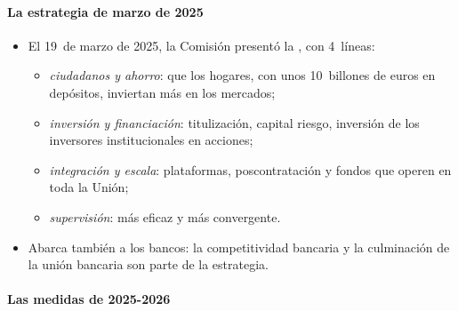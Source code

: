 \documentclass[11pt]{article}
\begin{document}
\paragraph{La estrategia de marzo de 2025}

\begin{itemize}
\item El 19~de marzo de 2025, la Comisión presentó la , con 4~líneas\nocite{CE2025UAI}:
  \begin{itemize}
  \item \emph{ciudadanos y ahorro}: que los hogares, con unos 10~billones de euros en depósitos, inviertan más en los mercados;
  \item \emph{inversión y financiación}: titulización, capital riesgo, inversión de los inversores institucionales en acciones;
  \item \emph{integración y escala}: plataformas, poscontratación y fondos que operen en toda la Unión;
  \item \emph{supervisión}: más eficaz y más convergente.
  \end{itemize}
\item Abarca también a los bancos: la competitividad bancaria y la culminación de la unión bancaria son parte de la estrategia.
\end{itemize}

\paragraph{Las medidas de 2025-2026}
\end{document}
